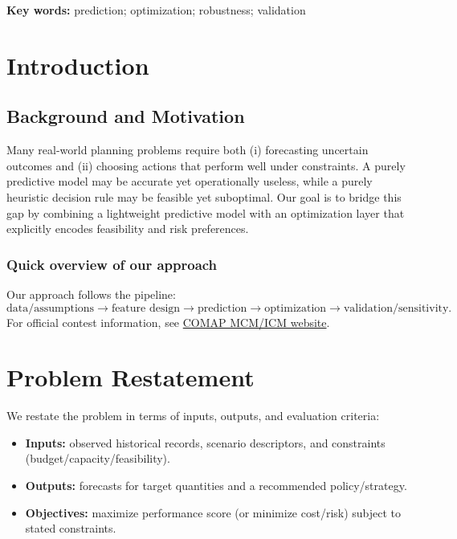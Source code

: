 \documentclass[12pt]{article}
\begin{document}
\vspace{0.8em}
\noindent\textbf{Key words:} prediction; optimization; robustness; validation

\clearpage

\setcounter{page}{1}
\setcounter{tocdepth}{2}
\tableofcontents

\clearpage

\section{Introduction}
\subsection{Background and Motivation}
Many real-world planning problems require both (i) forecasting uncertain outcomes and (ii) choosing actions that perform well
under constraints. A purely predictive model may be accurate yet operationally useless, while a purely heuristic decision rule
may be feasible yet suboptimal. Our goal is to bridge this gap by combining a lightweight predictive model with an optimization layer
that explicitly encodes feasibility and risk preferences.

\subsubsection{Quick overview of our approach}
Our approach follows the pipeline:
\[
\text{data/assumptions} \rightarrow \text{feature design} \rightarrow \text{prediction} \rightarrow \text{optimization} \rightarrow \text{validation/sensitivity}.
\]
For official contest information, see \href{https://www.contest.comap.com/undergraduate/contests/mcm/}{COMAP MCM/ICM website}.

\section{Problem Restatement}
We restate the problem in terms of inputs, outputs, and evaluation criteria:
\begin{itemize}[leftmargin=*]
  \item \textbf{Inputs:} observed historical records, scenario descriptors, and constraints (budget/capacity/feasibility).
  \item \textbf{Outputs:} forecasts for target quantities and a recommended policy/strategy.
  \item \textbf{Objectives:} maximize performance score (or minimize cost/risk) subject to stated constraints.
\end{itemize}
\end{document}
